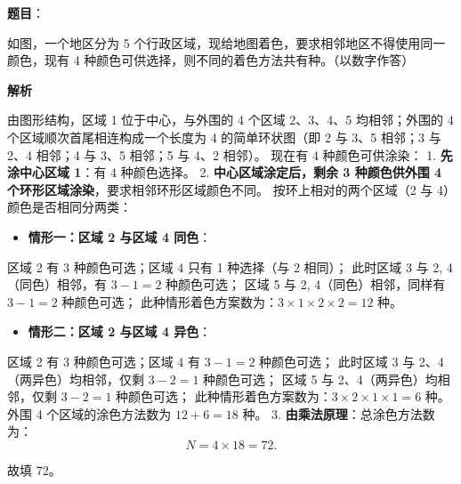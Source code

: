 \begin{answer}

\textbf{题目}：

如图，一个地区分为 5 个行政区域，现给地图着色，要求相邻地区不得使用同一颜色，现有 4 种颜色可供选择，则不同的着色方法共有\gkblank{}种。（以数字作答）
\nopagebreak[4]
\begin{center}\end{center}
\nopagebreak[4]
\textbf{解析}

由图形结构，区域 1 位于中心，与外围的 4 个区域 2、3、4、5 均相邻；外围的 4 个区域顺次首尾相连构成一个长度为 4 的简单环状图（即 2 与 3、5 相邻；3 与 2、4 相邻；4 与 3、5 相邻；5 与 4、2 相邻）。
现在有 4 种颜色可供涂染：
1. \textbf{先涂中心区域 1}：有 4 种颜色选择。
2. \textbf{中心区域涂定后，剩余 3 种颜色供外围 4 个环形区域涂染}，要求相邻环形区域颜色不同。
   按环上相对的两个区域（2 与 4）颜色是否相同分两类：
\begin{itemize}
\item \textbf{情形一：区域 2 与区域 4 同色}：
\end{itemize}
     区域 2 有 3 种颜色可选；区域 4 只有 1 种选择（与 2 相同）；
     此时区域 3 与 2, 4（同色）相邻，有 $3 - 1 = 2$ 种颜色可选；
     区域 5 与 2, 4（同色）相邻，同样有 $3 - 1 = 2$ 种颜色可选；
     此种情形着色方案数为：$3 \times 1 \times 2 \times 2 = 12$ 种。
\begin{itemize}
\item \textbf{情形二：区域 2 与区域 4 异色}：
\end{itemize}
     区域 2 有 3 种颜色可选；区域 4 有 $3 - 1 = 2$ 种颜色可选；
     此时区域 3 与 2、4（两异色）均相邻，仅剩 $3 - 2 = 1$ 种颜色可选；
     区域 5 与 2、4（两异色）均相邻，仅剩 $3 - 2 = 1$ 种颜色可选；
     此种情形着色方案数为：$3 \times 2 \times 1 \times 1 = 6$ 种。
   外围 4 个区域的涂色方法数为 $12 + 6 = 18$ 种。
3. \textbf{由乘法原理}：总涂色方法数为：
\nopagebreak[4]
\[N = 4 \times 18 = 72.\]

故填 72。


\end{answer}
